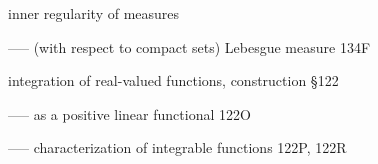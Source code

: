 







































\indexmedskip

































inner regularity of measures



----- (with respect to compact sets) Lebesgue measure 134F

















integration of real-valued functions, construction \S122

----- as a positive linear functional 122O





----- characterization of integrable functions 122P, 122R



